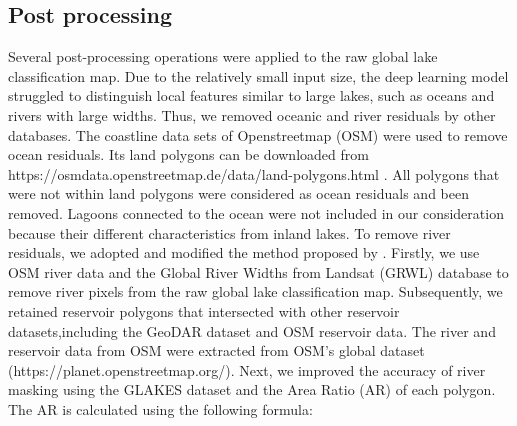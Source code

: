 \documentclass[preprint,12pt,authoryear]{elsarticle}
\begin{document}
\subsection{Post processing}
\label{subsec4}

Several post-processing operations were applied to the raw global lake classification map. Due to the relatively small input size, the deep learning model struggled to distinguish local features similar to large lakes, such as oceans and rivers with large widths. Thus, we removed oceanic and river residuals by other databases. The coastline data sets of Openstreetmap (OSM) \citep{goodchild_citizens_2007} were used to remove ocean residuals. Its land polygons can be downloaded from https://osmdata.openstreetmap.de/data/land-polygons.html . All polygons that were not within land polygons were considered as ocean residuals and been removed. Lagoons connected to the ocean were not included in our consideration because their different characteristics from inland lakes. To remove river residuals, we adopted and modified the method proposed by \citet{pi_mapping_2022}. Firstly, we use OSM river data and the Global River Widths from Landsat (GRWL)\citep{allen_global_2018} database to remove river pixels from the raw global lake classification map. Subsequently, we retained reservoir polygons that intersected with other reservoir datasets,including the GeoDAR dataset \citep{wang_surface_2025} and OSM reservoir data. The river and reservoir data from OSM were extracted from OSM's global dataset (https://planet.openstreetmap.org/). Next, we improved the accuracy of river masking using the GLAKES dataset and the Area Ratio (AR) of each polygon. The AR is calculated using the following formula:
\end{document}
